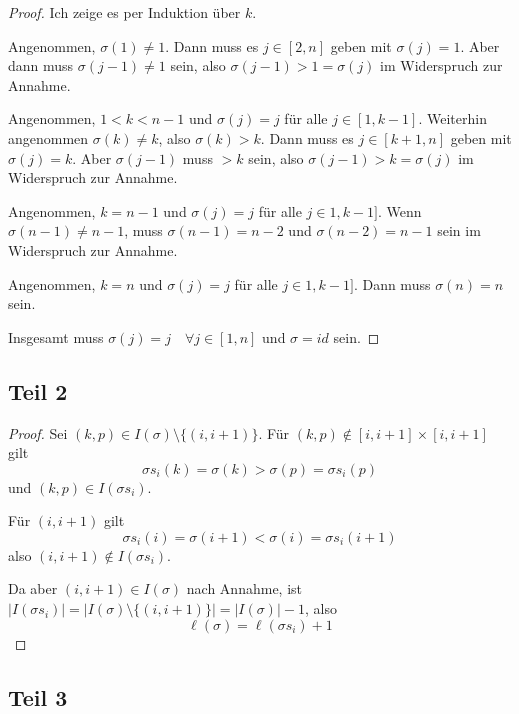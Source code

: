 \documentclass[10pt,a4paper]{article}
\begin{document}
\begin{proof}
Ich zeige es per Induktion über $k$.

Angenommen, $\sigma(1) \ne 1$.
Dann muss es $j \in [2, n]$ geben mit $\sigma(j) = 1$.
Aber dann muss $\sigma(j - 1) \ne 1$ sein, also $\sigma(j - 1) > 1 = \sigma(j)$ im Widerspruch zur Annahme.

Angenommen, $1 < k < n - 1$ und $\sigma(j) = j$ für alle $j \in [1, k - 1]$.
Weiterhin angenommen $\sigma(k) \ne k$, also $\sigma(k) > k$.
Dann muss es $j \in [k + 1, n]$ geben mit $\sigma(j) = k$.
Aber $\sigma(j - 1)$ muss $> k$ sein, also $\sigma(j - 1) > k = \sigma(j)$ im Widerspruch zur Annahme.

Angenommen, $k = n - 1$ und $\sigma(j) = j$ für alle $j \in 1, k - 1]$.
Wenn $\sigma(n - 1) \ne n - 1$, muss $\sigma(n - 1) = n - 2$ und $\sigma(n - 2) = n - 1$ sein im Widerspruch zur Annahme.

Angenommen, $k = n$ und $\sigma(j) = j$ für alle $j \in 1, k - 1]$.
Dann muss $\sigma(n) = n$ sein.

Insgesamt muss $\sigma(j) = j \quad \forall j \in [1, n]$ und $\sigma = id$ sein.
\end{proof}

\subsection*{Teil 2}

\begin{proof}
Sei $(k, p) \in I(\sigma) \setminus \{(i, i + 1)\}$.
Für $(k, p) \notin [i, i + 1] \times [i, i + 1]$ gilt
\begin{equation}
\sigma s_{i}(k) = \sigma(k) > \sigma(p) = \sigma s_{i}(p)
\end{equation}
und $(k, p) \in I(\sigma s_{i})$.

Für $(i, i + 1)$ gilt
\begin{equation}
\sigma s_{i}(i) = \sigma(i + 1) < \sigma(i) = \sigma s_{i}(i + 1)
\end{equation}
also $(i, i + 1) \notin I(\sigma s_{i})$.

Da aber $(i, i + 1) \in I(\sigma)$ nach Annahme, ist $|I(\sigma s_{i})| = |I(\sigma) \setminus \{(i, i + 1)\}| = |I(\sigma)| - 1$, also
\begin{equation}
\ell(\sigma) = \ell(\sigma s_{i}) + 1
\end{equation}
\end{proof}

\subsection*{Teil 3}
\end{document}
